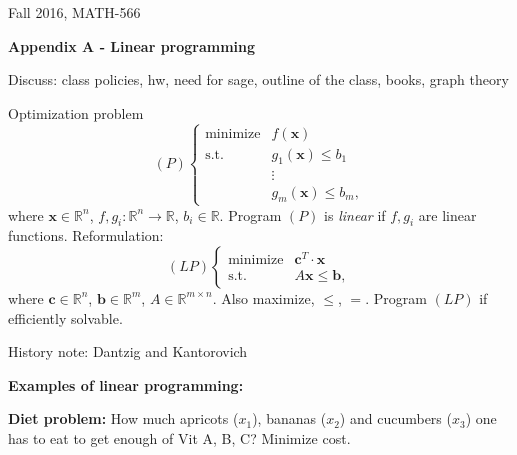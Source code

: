 \documentclass[11pt]{article}
\begin{document}

Fall  2016, MATH-566

\centerline{{\Large \textbf{Appendix A - Linear programming}}}

Discuss: class policies, hw, need for sage, outline of the class, books, graph theory

Optimization problem
\[
(P) \begin{cases}
\text{minimize}  & f(\textbf{x}) \\ 
\text{s.t.}           & g_1(\textbf{x}) \leq b_1 \\
                         &       \vdots                     \\
                         & g_m(\textbf{x}) \leq b_m,
\end{cases}
\]
where $\textbf{x} \in \mathbb{R}^n$, $f,g_i: \mathbb{R}^n \rightarrow \mathbb{R}$, $b_i \in \mathbb{R}$.
Program $(P)$ is \emph{linear} if $f,g_i$ are linear functions. Reformulation:
\[
(LP) \begin{cases}
\text{minimize}  & \textbf{c}^T \cdot \textbf{x} \\ 
\text{s.t.}           & A \textbf{x} \leq \textbf{b},
\end{cases}
\]
where $\textbf{c} \in \mathbb{R}^n$, $\textbf{b} \in \mathbb{R}^m$,
$A \in \mathbb{R}^{m\times n}$. Also maximize, $\leq$, $=$. Program $(LP)$ if efficiently solvable.

History note: Dantzig and Kantorovich

\textbf{Examples of linear programming:}

\textbf{Diet problem:}
How much apricots ($x_1$), bananas ($x_2$) and cucumbers ($x_3$) one has to eat
to get enough of Vit A, B, C? Minimize cost.
\end{document}
